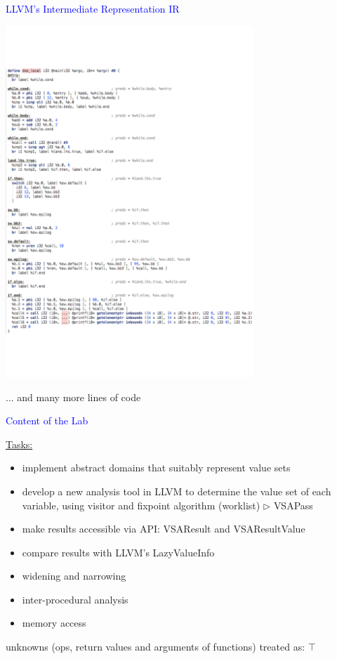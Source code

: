 \begin{frame}[fragile]{\textcolor{blue}{LLVM's Intermediate Representation IR}}
\begin{center}
\includegraphics[width=0.7\textwidth, trim={0.1cm 12cm 4.5cm 2.5cm},clip]{src/example_ll.pdf} 
\end{center}

\hfill ... and many more lines of code
\end{frame}
\begin{frame}[fragile]{\textcolor{blue}{Content of the Lab}}

\underline{Tasks:}
\begin{itemize}
\item implement {\color{blue}abstract domain}s that suitably represent value sets
\item develop a new analysis tool in LLVM to determine the value set of each \\
\qquad variable, using visitor and fixpoint algorithm (worklist) $\triangleright$ {\color{blue} VSAPass}
\item make results accessible via API: {\color{blue} VSAResult} and {\color{blue} VSAResultValue}
\item compare results with LLVM's {\color{blue} LazyValueInfo}
\end{itemize}

\vspace{1cm}

\underline{}
\begin{itemize}
\item widening and narrowing
\item inter-procedural analysis
\item memory access 
\end{itemize}
\hfill unknowns (ops, return values and arguments of functions) treated as: {\color{blue} $\top$}

\end{frame}
